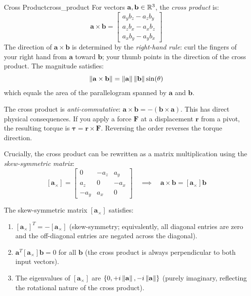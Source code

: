 \begin{definition}{Cross Product}{cross_product}
For vectors $\mathbf{a}, \mathbf{b} \in \mathbb{R}^3$, the \emph{cross product} is:
\begin{equation}
   \mathbf{a} \times \mathbf{b} = \begin{bmatrix} a_y b_z - a_z b_y \\ a_z b_x - a_x b_z \\ a_x b_y - a_y b_x \end{bmatrix}
\end{equation}
The direction of $\mathbf{a} \times \mathbf{b}$ is determined by the \emph{right-hand rule}: curl the fingers of your right hand from $\mathbf{a}$ toward $\mathbf{b}$; your thumb points in the direction of the cross product. The magnitude satisfies:
\begin{equation}
    \left\lVert \mathbf{a} \times \mathbf{b} \right\rVert = \left\lVert \mathbf{a} \right\rVert\left\lVert \mathbf{b} \right\rVert\sin(\theta)
\end{equation}
which equals the area of the parallelogram spanned by $\mathbf{a}$ and $\mathbf{b}$.
\end{definition}

The cross product is \emph{anti-commutative}: $\mathbf{a} \times \mathbf{b} = -(\mathbf{b} \times \mathbf{a})$. This has direct physical consequences. If you apply a force $\mathbf{F}$ at a displacement $\mathbf{r}$ from a pivot, the resulting torque is $\boldsymbol{\tau} = \mathbf{r} \times \mathbf{F}$. Reversing the order reverses the torque direction.

Crucially, the cross product can be rewritten as a matrix multiplication using the \emph{skew-symmetric matrix}:
\begin{equation}
\label{eq:ch1_skew_symmetric}
    [\mathbf{a}_\times] = \begin{bmatrix} 0 & -a_z & a_y \\ a_z & 0 & -a_x \\ -a_y & a_x & 0 \end{bmatrix} \quad \implies \quad \mathbf{a} \times \mathbf{b} = [\mathbf{a}_\times] \mathbf{b}
\end{equation}

\begin{proposition}
\label{prop:skew_symmetric_properties}
The skew-symmetric matrix $[\mathbf{a}_\times]$ satisfies:
\begin{enumerate}[label=(\roman*)]
    \item $[\mathbf{a}_\times]^T = -[\mathbf{a}_\times]$ (skew-symmetry; equivalently, all diagonal entries are zero and the off-diagonal entries are negated across the diagonal).
    \item $\mathbf{a}^T [\mathbf{a}_\times] \mathbf{b} = 0$ for all $\mathbf{b}$ (the cross product is always perpendicular to both input vectors).
    \item The eigenvalues of $[\mathbf{a}_\times]$ are $\{0, +i\left\lVert \mathbf{a} \right\rVert, -i\left\lVert \mathbf{a} \right\rVert\}$ (purely imaginary, reflecting the rotational nature of the cross product).
\end{enumerate}
\end{proposition}

